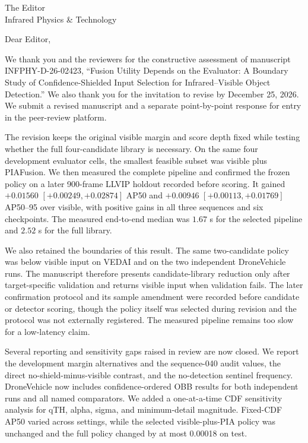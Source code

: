 \documentclass[a4paper,10pt]{letter}
\begin{document}
\sloppy
\begin{letter}{The Editor\\Infrared Physics \& Technology}
\opening{Dear Editor,}

We thank you and the reviewers for the constructive assessment of manuscript
INFPHY-D-26-02423, ``Fusion Utility Depends on the Evaluator: A Boundary
Study of Confidence-Shielded Input Selection for Infrared--Visible Object
Detection.'' We also thank you for the invitation to revise by December 25,
2026. We submit a revised manuscript and a separate point-by-point response
for entry in the peer-review platform.

The revision keeps the original visible margin and score depth fixed while
testing whether the full four-candidate library is necessary. On the same four
development evaluator cells, the smallest feasible subset was visible plus
PIAFusion. We then measured the complete pipeline and confirmed the frozen
policy on a later 900-frame LLVIP holdout recorded before scoring. It gained
\(+0.01560\) \([+0.00249,+0.02874]\) AP50 and \(+0.00946\)
\([+0.00113,+0.01769]\) AP50--95 over visible, with positive gains in all
three sequences and six checkpoints. The measured end-to-end median was
\(1.67\) s for the selected pipeline and \(2.52\) s for the full library.

We also retained the boundaries of this result. The same two-candidate policy
was below visible input on VEDAI and on the two independent DroneVehicle runs.
The manuscript therefore presents candidate-library reduction only after
target-specific validation and returns visible input when validation fails.
The later confirmation protocol and its sample amendment were recorded before
candidate or detector scoring, though the policy itself was selected during
revision and the protocol was not externally registered. The measured
pipeline remains too slow for a low-latency claim.

Several reporting and sensitivity gaps raised in review are now closed. We
report the development margin alternatives and the sequence-040 audit values,
the direct no-shield-minus-visible contrast, and the no-detection sentinel
frequency. DroneVehicle now includes confidence-ordered OBB results for both
independent runs and all named comparators. We added a one-at-a-time CDF
sensitivity analysis for qTH, alpha, sigma, and minimum-detail magnitude.
Fixed-CDF AP50 varied across settings, while the selected visible-plus-PIA
policy was unchanged and the full policy changed by at most 0.00018 on test.


\end{letter}
\end{document}
